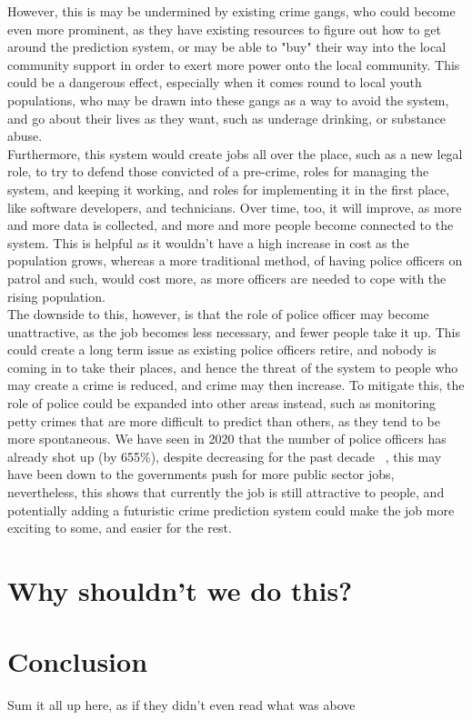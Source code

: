\documentclass[12pt]{amsart}
\begin{document}
    However, this is may be undermined by existing crime gangs, who could become even more prominent, as they have
    existing resources to figure out how to get around the prediction system, or may be able to "buy" their way into
    the local community support in order to exert more power onto the local community.
    This could be a dangerous effect, especially when it comes round to local youth populations, who may be drawn into
    these gangs as a way to avoid the system, and go about their lives as they want, such as underage drinking, or
    substance abuse.
    \\

    Furthermore, this system would create jobs all over the place, such as a new legal role, to try to defend those
    convicted of a pre-crime, roles for managing the system, and keeping it working, and roles for implementing it in
    the first place, like software developers, and technicians.
    Over time, too, it will improve, as more and more data is collected, and more and more people become connected to
    the system.
    This is helpful as it wouldn't have a high increase in cost as the population grows, whereas a more traditional
    method, of having police officers on patrol and such, would cost more, as more officers are needed to cope with
    the rising population.
    \\

    The downside to this, however, is that the role of police officer may become unattractive, as the job becomes less
    necessary, and fewer people take it up.
    This could create a long term issue as existing police officers retire, and nobody is coming in to take
    their places, and hence the threat of the system to people who may create a crime is reduced, and crime may then
    increase.
    To mitigate this, the role of police could be expanded into other areas instead, such as monitoring petty crimes
    that are more difficult to predict than others, as they tend to be more spontaneous.
    We have seen in 2020 that the number of police officers has already shot up (by 655\%), despite decreasing
    for the past decade ~\cite{ho-pw}, this may have been down to the governments push for more public sector jobs,
    nevertheless, this shows that currently the job is still attractive to people, and potentially adding a futuristic
    crime prediction system could make the job more exciting to some, and easier for the rest.


    \section{Why shouldn't we do this?}\label{sec:why-shouldn't-we-do-this?}
    

    \section{Conclusion}\label{sec:conclusion}  %

    Sum it all up here, as if they didn't even read what was above ~\cite{mr-book}

    {}
    
\end{document}
